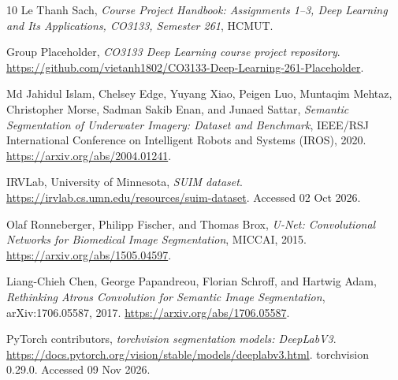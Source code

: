 {}
\begin{thebibliography}{10}
Le Thanh Sach, \emph{Course Project Handbook: Assignments 1--3, Deep Learning
and Its Applications, CO3133, Semester 261}, HCMUT.

Group Placeholder, \emph{CO3133 Deep Learning course project repository}.
\url{https://github.com/vietanh1802/CO3133-Deep-Learning-261-Placeholder}.

Md Jahidul Islam, Chelsey Edge, Yuyang Xiao, Peigen Luo, Muntaqim Mehtaz,
Christopher Morse, Sadman Sakib Enan, and Junaed Sattar,
\emph{Semantic Segmentation of Underwater Imagery: Dataset and Benchmark},
IEEE/RSJ International Conference on Intelligent Robots and Systems (IROS), 2020.
\url{https://arxiv.org/abs/2004.01241}.

IRVLab, University of Minnesota, \emph{SUIM dataset}.
\url{https://irvlab.cs.umn.edu/resources/suim-dataset}. Accessed 02 Oct 2026.

Olaf Ronneberger, Philipp Fischer, and Thomas Brox,
\emph{U-Net: Convolutional Networks for Biomedical Image Segmentation},
MICCAI, 2015. \url{https://arxiv.org/abs/1505.04597}.

Liang-Chieh Chen, George Papandreou, Florian Schroff, and Hartwig Adam,
\emph{Rethinking Atrous Convolution for Semantic Image Segmentation},
arXiv:1706.05587, 2017. \url{https://arxiv.org/abs/1706.05587}.

PyTorch contributors, \emph{torchvision segmentation models: DeepLabV3}.
\url{https://docs.pytorch.org/vision/stable/models/deeplabv3.html}.
torchvision 0.29.0. Accessed 09 Nov 2026.
\end{thebibliography}
